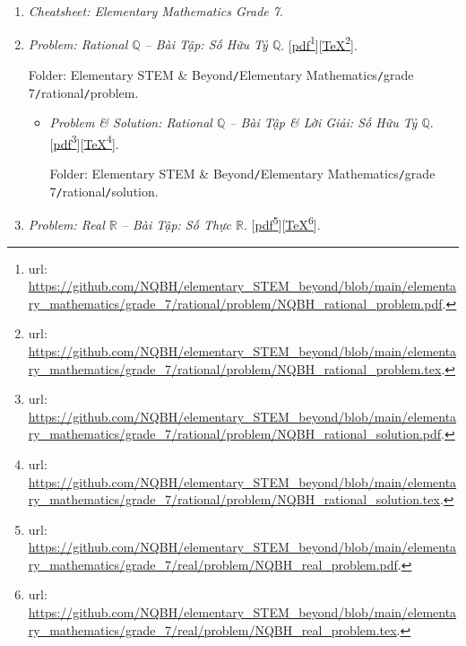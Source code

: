 \documentclass[12pt,oneside]{book}
\begin{document}
\begin{enumerate}
	\item {\it Cheatsheet: Elementary Mathematics Grade 7}.
	
	\item {\it Problem: Rational $\mathbb{Q}$ -- Bài Tập: Số Hữu Tỷ $\mathbb{Q}$}. [\href{https://github.com/NQBH/elementary_STEM_beyond/blob/main/elementary_mathematics/grade_7/rational/problem/NQBH_rational_problem.pdf}{pdf}\footnote{{\sc url}: \url{https://github.com/NQBH/elementary_STEM_beyond/blob/main/elementary_mathematics/grade_7/rational/problem/NQBH_rational_problem.pdf}.}][\href{https://github.com/NQBH/elementary_STEM_beyond/blob/main/elementary_mathematics/grade_7/rational/problem/NQBH_rational_problem.tex}{\TeX}\footnote{{\sc url}: \url{https://github.com/NQBH/elementary_STEM_beyond/blob/main/elementary_mathematics/grade_7/rational/problem/NQBH_rational_problem.tex}.}].
	
	Folder: {\sf Elementary STEM \& Beyond{\tt/}Elementary Mathematics{\tt/}grade 7{\tt/}rational{\tt/}problem}.
	\begin{itemize}
		\item {\it Problem \& Solution: Rational $\mathbb{Q}$ -- Bài Tập \& Lời Giải: Số Hữu Tỷ $\mathbb{Q}$}. [\href{https://github.com/NQBH/elementary_STEM_beyond/blob/main/elementary_mathematics/grade_7/rational/problem/NQBH_rational_solution.pdf}{pdf}\footnote{{\sc url}: \url{https://github.com/NQBH/elementary_STEM_beyond/blob/main/elementary_mathematics/grade_7/rational/problem/NQBH_rational_solution.pdf}.}][\href{https://github.com/NQBH/elementary_STEM_beyond/blob/main/elementary_mathematics/grade_7/rational/problem/NQBH_rational_solution.tex}{\TeX}\footnote{{\sc url}: \url{https://github.com/NQBH/elementary_STEM_beyond/blob/main/elementary_mathematics/grade_7/rational/problem/NQBH_rational_solution.tex}.}].
		
		Folder: {\sf Elementary STEM \& Beyond{\tt/}Elementary Mathematics{\tt/}grade 7{\tt/}rational{\tt/}solution}.
	\end{itemize}
	\item {\it Problem: Real $\mathbb{R}$ -- Bài Tập: Số Thực $\mathbb{R}$}. [\href{https://github.com/NQBH/elementary_STEM_beyond/blob/main/elementary_mathematics/grade_7/real/problem/NQBH_real_problem.pdf}{pdf}\footnote{{\sc url}: \url{https://github.com/NQBH/elementary_STEM_beyond/blob/main/elementary_mathematics/grade_7/real/problem/NQBH_real_problem.pdf}.}][\href{https://github.com/NQBH/elementary_STEM_beyond/blob/main/elementary_mathematics/grade_7/real/problem/NQBH_real_problem.tex}{\TeX}\footnote{{\sc url}: \url{https://github.com/NQBH/elementary_STEM_beyond/blob/main/elementary_mathematics/grade_7/real/problem/NQBH_real_problem.tex}.}].
	

\end{enumerate}
\end{document}
